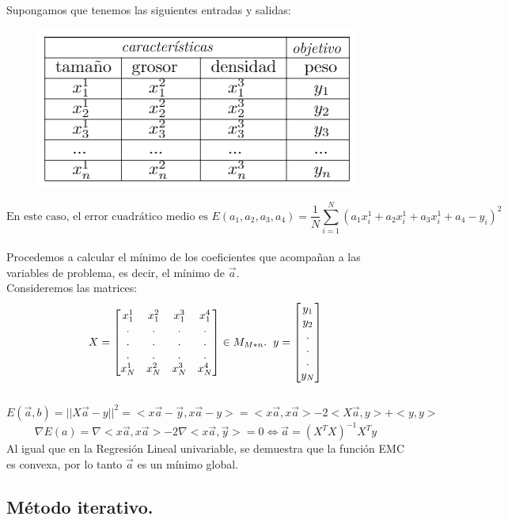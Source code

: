 \documentclass[a4paper,11pt]{article}
\begin{document}
\noindent
Supongamos que tenemos las siguientes entradas y salidas: 

\begin{figure}[H]
\centering
\includegraphics[scale=0.7]{Annotation 2020-03-23 133547}
\end{figure}
 \[\text{En este caso, el error cuadrático medio es } E(a_{1},a_{2},a_{3},a_{4})=\frac{1}{N}\sum_{i=1}^{N}(a_{1}x_i^1+a_{2}x_i^1+a_{3}x_i^1+a_{4}-y_{i})^2
\]
\\Procedemos a calcular el mínimo de los coeficientes que acompañan a las variables de problema, es decir, el mínimo de $\vec{a}$.\\

\noindent
Consideremos las matrices:
\[X= \begin{bmatrix}
    x_{1}^1 & x_{1}^2 & x_{1}^3 & x_{1}^4  \\
    .&.&.&.\\
    .&.&.&.\\
    .&.&.&.\\
    x_{N}^1 & x_{N}^2 & x_{N}^3 & x_{N}^4 
\end{bmatrix} \in M_{M*n}. \hspace{0.20cm} y=\begin{bmatrix}y_{1}\\y_{2}\\.\\.\\.\\y_{N}\end{bmatrix}\] \\ \[E(\vec{a},b)=||X\vec{a}-y||^2 = <x\vec{a}-\vec{y},x\vec{a}-y>=<x\vec{a},x\vec{a}>-2<X\vec{a},y>+<y,y>\]
\[\nabla E(a)=\nabla<x\vec{a},x\vec{a}>-2\nabla<x\vec{a},\vec{y}>=0\Leftrightarrow \boxed{ \vec{a}=(X^T X)^{-1} X^T y}\]
Al igual que en la Regresión Lineal univariable, se demuestra que la función EMC es convexa, por lo tanto $\vec{a}$ es un mínimo global.


\subsection{Método iterativo.}
\end{document}
